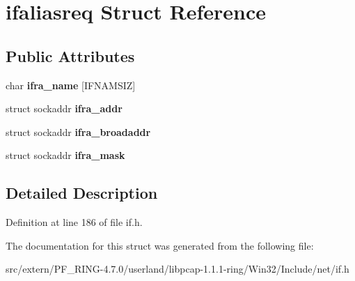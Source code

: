 \hypertarget{structifaliasreq}{
\section{ifaliasreq Struct Reference}
\label{structifaliasreq}
}
\subsection*{Public Attributes}
\begin{DoxyCompactItemize}
\item 
\hypertarget{structifaliasreq_a125141053f5c31475e2329e0399a8122}{
char {\bfseries ifra\_\-name} \mbox{[}IFNAMSIZ\mbox{]}}
\label{structifaliasreq_a125141053f5c31475e2329e0399a8122}

\item 
\hypertarget{structifaliasreq_ae06f2c0bfe59ffac0503eea85ba34412}{
struct sockaddr {\bfseries ifra\_\-addr}}
\label{structifaliasreq_ae06f2c0bfe59ffac0503eea85ba34412}

\item 
\hypertarget{structifaliasreq_a6d65a05e7812960f49a48c14b1e9a54f}{
struct sockaddr {\bfseries ifra\_\-broadaddr}}
\label{structifaliasreq_a6d65a05e7812960f49a48c14b1e9a54f}

\item 
\hypertarget{structifaliasreq_a123134b88f11f2e799f7823183f08477}{
struct sockaddr {\bfseries ifra\_\-mask}}
\label{structifaliasreq_a123134b88f11f2e799f7823183f08477}

\end{DoxyCompactItemize}


\subsection{Detailed Description}


Definition at line 186 of file if.h.



The documentation for this struct was generated from the following file:\begin{DoxyCompactItemize}
\item 
src/extern/PF\_\-RING-\/4.7.0/userland/libpcap-\/1.1.1-\/ring/Win32/Include/net/if.h\end{DoxyCompactItemize}
